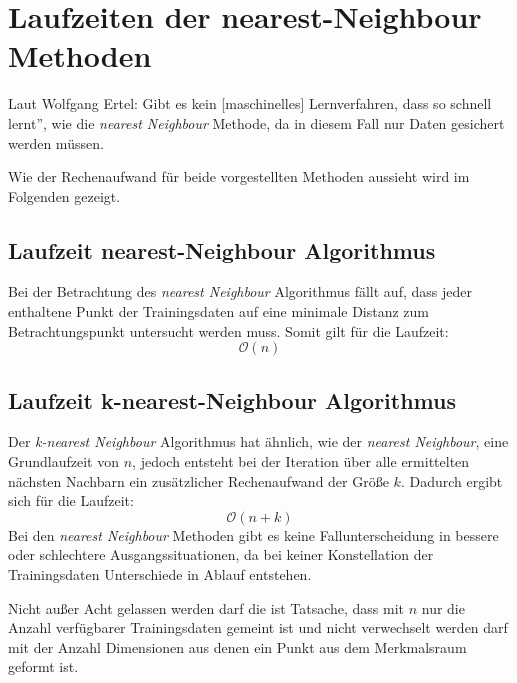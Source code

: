 \documentclass[fontsize=11pt]{scrartcl}
\begin{document}
                         
        \section{Laufzeiten der nearest-Neighbour Methoden}
        \label{sec:laufzeit}
            Laut Wolfgang Ertel: \glqq Gibt es kein [maschinelles] Lernverfahren, dass so schnell lernt”\cite[S. 213]{ertel2016}, wie die \emph{nearest Neighbour} Methode, da in diesem Fall nur Daten gesichert werden müssen.\par
            Wie der Rechenaufwand für beide vorgestellten Methoden aussieht wird im Folgenden gezeigt.
                        
            \subsection{Laufzeit nearest-Neighbour Algorithmus}
                Bei der Betrachtung des \emph{nearest Neighbour} Algorithmus fällt auf, dass jeder enthaltene Punkt der Trainingsdaten auf eine minimale Distanz zum Betrachtungspunkt untersucht werden muss. Somit gilt für die Laufzeit:
                $$
                    \mathcal{O}(n)
                $$   
            
            \subsection{Laufzeit        k-nearest-Neighbour Algorithmus}
                Der \emph{k-nearest Neighbour} Algorithmus hat ähnlich, wie der \emph{nearest Neighbour}, eine Grundlaufzeit von $n$, jedoch entsteht bei der Iteration über alle ermittelten nächsten Nachbarn ein zusätzlicher Rechenaufwand der Größe $k$. Dadurch ergibt sich für die Laufzeit:
                $$
                    \mathcal{O}(n+k)
                $$
                Bei den \emph{nearest Neighbour} Methoden gibt es keine Fallunterscheidung in bessere oder schlechtere Ausgangssituationen, da bei keiner Konstellation der Trainingsdaten Unterschiede in Ablauf entstehen. \par
                Nicht außer Acht gelassen werden darf die ist Tatsache, dass mit $n$ nur die Anzahl verfügbarer Trainingsdaten gemeint ist und nicht verwechselt werden darf mit der Anzahl Dimensionen aus denen ein Punkt aus dem Merkmalsraum geformt ist.  


    \newpage

    
    
\end{document}
